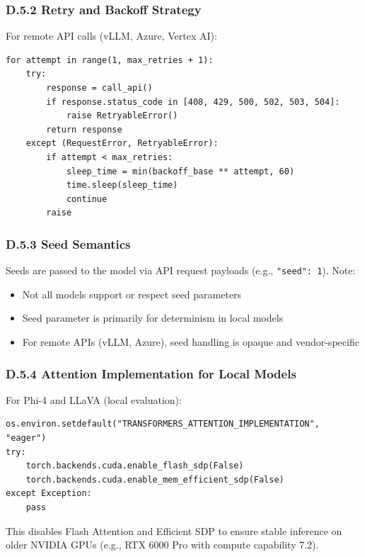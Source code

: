 \subsubsection*{D.5.2 Retry and Backoff Strategy}

For remote API calls (vLLM, Azure, Vertex AI):

\begin{verbatim}
for attempt in range(1, max_retries + 1):
    try:
        response = call_api()
        if response.status_code in [408, 429, 500, 502, 503, 504]:
            raise RetryableError()
        return response
    except (RequestError, RetryableError):
        if attempt < max_retries:
            sleep_time = min(backoff_base ** attempt, 60)
            time.sleep(sleep_time)
            continue
        raise
\end{verbatim}

\subsubsection*{D.5.3 Seed Semantics}

Seeds are passed to the model via API request payloads (e.g., \texttt{"seed": 1}). Note:
\begin{itemize}
    \item Not all models support or respect seed parameters
    \item Seed parameter is primarily for determinism in local models
    \item For remote APIs (vLLM, Azure), seed handling is opaque and vendor-specific
\end{itemize}

\subsubsection*{D.5.4 Attention Implementation for Local Models}

For Phi-4 and LLaVA (local evaluation):

\begin{verbatim}
os.environ.setdefault("TRANSFORMERS_ATTENTION_IMPLEMENTATION", "eager")
try:
    torch.backends.cuda.enable_flash_sdp(False)
    torch.backends.cuda.enable_mem_efficient_sdp(False)
except Exception:
    pass
\end{verbatim}

This disables Flash Attention and Efficient SDP to ensure stable inference on older NVIDIA GPUs (e.g., RTX 6000 Pro with compute capability 7.2).

